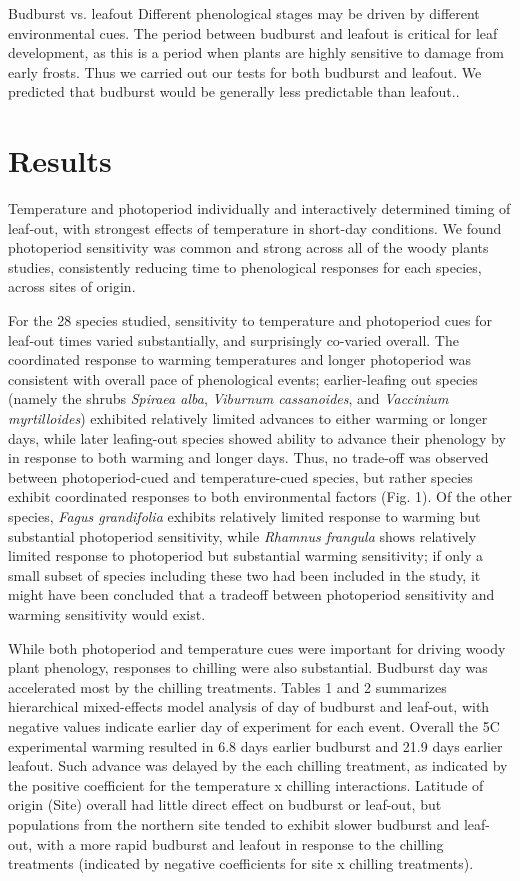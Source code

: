 \documentclass{article}
\begin{document}
Budburst vs. leafout
Different phenological stages may be driven by different environmental cues. The period between budburst and leafout is critical for leaf development, as this is a period when plants are highly sensitive to damage from early frosts. Thus we carried out our tests for both budburst and leafout. We predicted that budburst would be generally less predictable than leafout..

\section*{Results}

Temperature and photoperiod individually and interactively determined timing of leaf-out, with strongest effects of temperature in short-day conditions. We found photoperiod sensitivity was common and strong across all of the woody plants studies, consistently reducing time to phenological responses for each species, across sites of origin. 

For the 28 species studied, sensitivity to temperature and photoperiod cues for leaf-out times varied substantially, and surprisingly co-varied overall. The coordinated response to warming temperatures and longer photoperiod was consistent with overall pace of phenological events; earlier-leafing out species (namely the shrubs \emph{Spiraea alba}, \emph{Viburnum cassanoides}, and \emph{Vaccinium myrtilloides}) exhibited relatively limited advances to either warming or longer days, while later leafing-out species showed ability to advance their phenology by in response to both warming and longer days. Thus, no trade-off was observed between photoperiod-cued and temperature-cued species, but rather species exhibit coordinated responses to both environmental factors (Fig. 1). Of the other species, \emph{Fagus grandifolia} exhibits relatively limited response to warming but substantial photoperiod sensitivity, while \emph{Rhamnus frangula} shows relatively limited response to photoperiod but substantial warming sensitivity; if only a small subset of species including these two had been included in the study, it might have been concluded that a tradeoff between photoperiod sensitivity and warming sensitivity would exist.

While both photoperiod and temperature cues were important for driving woody plant phenology, responses to chilling were also substantial. Budburst day was accelerated most by the chilling treatments. Tables 1 and 2 summarizes hierarchical mixed-effects model analysis of day of budburst and leaf-out, with negative values indicate earlier day of experiment for each event. Overall the 5\degree C experimental warming resulted in 6.8 days earlier budburst and 21.9 days earlier leafout. Such advance was delayed by the each chilling treatment, as indicated by the positive coefficient for the temperature x chilling interactions. Latitude of origin (Site) overall had little direct effect on budburst or leaf-out, but populations from the northern site tended to exhibit slower budburst and leaf-out, with a more rapid budburst and leafout in response to the chilling treatments (indicated by negative coefficients for site x chilling treatments).
\end{document}
